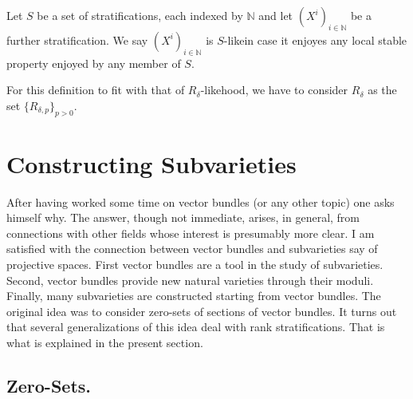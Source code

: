 \begin{defi*}
Let $S$ be a set of stratifications, each indexed by $\mathbb{N}$ and
let $(X^{i})_{i\in \mathbb{N}}$ be a further stratification. We say
$(X^{i})_{i\in \mathbb{N}}$ is $S$-like\pageoriginale in case it
enjoyes any local stable property enjoyed by any member of $S$.
\end{defi*}

For this definition to fit with that of $R_{\delta}$-likehood, we have
to consider $R_{\delta}$ as the set $\{R_{\delta,p}\}_{p>0}$. 

\section{Constructing Subvarieties}\label{chap6-sec6}

After having worked some time on vector bundles (or any other topic)
one asks himself why. The answer, though not immediate, arises, in
general, from connections with other fields whose interest is
presumably more clear. I am satisfied with the connection between
vector bundles and subvarieties say of projective spaces. First vector
bundles are a tool in the study of subvarieties. Second, vector
bundles provide new natural varieties through their moduli. Finally,
many subvarieties are constructed starting from vector bundles. The
original idea was to consider zero-sets of sections of vector
bundles. It turns out that several generalizations of this idea deal
with rank stratifications. That is what is explained in the present
section. 

\subsection{Zero-Sets.}\label{chap6-sec6.1}

